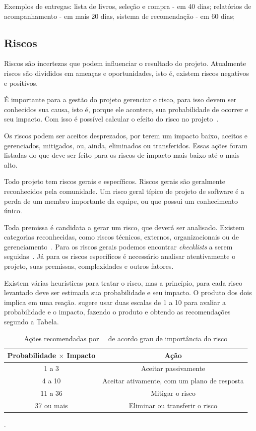 \documentclass[fontsize=12pt, a4paper,pagesize=auto,toc=listof, ,twoside,chapterprefix=false,appendixprefix=true,open=right]{scrbook}
\begin{document}
Exemplos de entregas: lista de livros, seleção e compra - em 40 dias; relatórios de acompanhamento - em mais 20 dias, sistema de recomendação - em 60 dias;

\subsection{Riscos}

Riscos são incertezas que podem influenciar o resultado do projeto.
Atualmente riscos são divididos em ameaças e oportunidades, isto é, existem riscos negativos e positivos.

É importante para a gestão do projeto gerenciar o risco, para isso devem ser conhecidos sua causa, isto é, porque ele acontece, sua probabilidade de ocorrer e seu impacto.
 Com isso é possível calcular o efeito do risco no projeto~\citep{kerzner:12ed,pmbok:6}.

Os riscos podem ser aceitos desprezados, por terem um impacto baixo, aceitos e gerenciados, mitigados, ou, ainda, eliminados ou transferidos.
Essas ações foram listadas do que deve ser feito para os riscos de impacto mais baixo até o mais alto.

Todo projeto tem riscos gerais e específicos. Riscos gerais são geralmente reconhecidos pela comunidade.
 Um risco geral típico de projeto de software é a perda de um membro importante da equipe, ou que possui um conhecimento único.


Toda premissa é candidata a gerar um risco, que deverá ser analisado.
 Existem categorias reconhecidas, como riscos técnicos, externos, organizacionais ou de gerenciamento~\citep{pmbok:6}.
Para os riscos gerais podemos encontrar \textit{checklists} a serem seguidas~\citep{radical:proj:man}.
Já para os riscos específicos é necessário analisar atentivamente o projeto, suas premissas, complexidades e outros fatores.

Existem várias heurísticas para tratar o risco, mas a princípio, para cada risco levantado deve ser estimada sua probabilidade e seu impacto. O produto dos dois implica em uma reação. \citet{finocchio:2013} sugere usar duas escalas de 1 a 10 para avaliar a probabilidade e o impacto, fazendo o produto e obtendo as recomendações segundo a Tabela.

\begin{table}[hbt]
    \centering
    \begin{tabular}{cc}
    \toprule
     Probabilidade $\times$ Impacto    &  Ação  \\
     \midrule
         1 a 3  & Aceitar passivamente \\
         4 a 10 & Aceitar ativamente, com um plano de resposta \\
         11 a 36 & Mitigar o risco \\
         37 ou mais & Eliminar ou transferir o risco \\
    \bottomrule
    \end{tabular}
    \caption{Ações recomendadas por~~\citep{finocchio:2013} de acordo grau de importância do risco}.
    \label{tab:risco}
\end{table}
\end{document}
